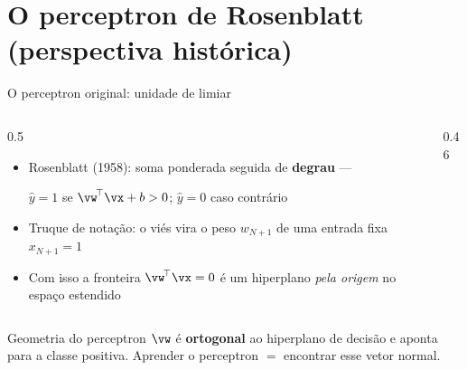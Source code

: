 \documentclass[aspectratio=169, 11pt]{beamer}
\begin{document}
\section{O perceptron de Rosenblatt (perspectiva histórica)}

\begin{frame}{O perceptron original: unidade de limiar}
  \begin{columns}[T]
    \begin{column}{0.5\textwidth}
      \begin{itemize}\setlength{\itemsep}{0.4ex}
        \item Rosenblatt (1958): soma ponderada seguida de \textbf{degrau} —
              \smallskip
              \begin{center}
                $\hat{y} = 1$ se $\vw^{\!\top}\vx + b > 0$;\;
                $\hat{y} = 0$ caso contrário
              \end{center}
              \smallskip
        \item Truque de notação: o viés vira o peso $w_{N+1}$ de uma entrada
              fixa $x_{N+1} = 1$
        \item Com isso a fronteira $\vw^{\!\top}\vx = 0$ é um hiperplano
              \emph{pela origem} no espaço estendido
      \end{itemize}
    \end{column}
    \begin{column}{0.46\textwidth}
      \begin{center}
        \scalebox{0.60}{\perceptron}
      \end{center}
    \end{column}
  \end{columns}

  \begin{defbox}{Geometria do perceptron}
    $\vw$ é \textbf{ortogonal} ao hiperplano de decisão e aponta para a classe
    positiva. Aprender o perceptron $=$ encontrar esse vetor normal.
  \end{defbox}
\end{frame}
\end{document}
